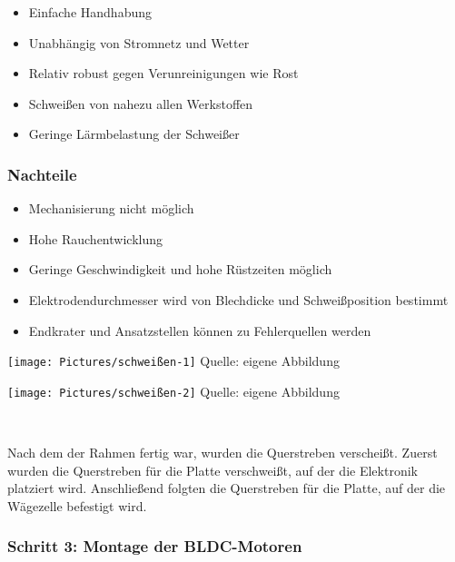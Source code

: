 \documentclass[ngerman,12pt,a4paper]{article}
\begin{document}
	 \begin{itemize}
	 		\item Einfache Handhabung
	 		\item Unabhängig von Stromnetz und Wetter
	 		\item Relativ robust gegen Verunreinigungen wie Rost
	 		\item Schweißen von nahezu allen Werkstoffen
	 		\item Geringe Lärmbelastung der Schweißer
	 \end{itemize}
	 
	 \subsubsection*{Nachteile}
	 
	 \begin{itemize}
	 		\item Mechanisierung nicht möglich
	 		\item Hohe Rauchentwicklung
	 		\item Geringe Geschwindigkeit und hohe Rüstzeiten möglich
	 		\item Elektrodendurchmesser wird von Blechdicke und Schweißposition bestimmt
	  		\item Endkrater und Ansatzstellen können zu Fehlerquellen werden
	 \end{itemize}
	 
	 \begin{center}
	 	\begin{minipage}{0.4\linewidth}
	 		\centering
	 		\texttt{[image: Pictures/schweißen-1]}
	 		\label{fig:schweißen-1}
	 		\small Quelle: eigene Abbildung
	 	\end{minipage}
	 	\hfill
	 	\begin{minipage}{0.4\linewidth}
	 		\centering
	 		\texttt{[image: Pictures/schweißen-2]}
	 		\label{fig:schweißen-2}
	 		\small Quelle: eigene Abbildung
	 	\end{minipage} \\[0.75cm]
	 \end{center} 
	Nach dem der Rahmen fertig war, wurden die Querstreben verscheißt. Zuerst wurden die Querstreben für die Platte verschweißt, auf der die Elektronik platziert wird. Anschließend folgten die Querstreben für die Platte, auf der die Wägezelle befestigt wird.
	
	\subsubsection*{Schritt 3: Montage der BLDC-Motoren}
	
\end{document}
